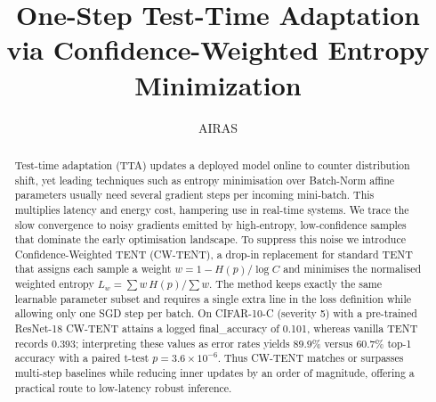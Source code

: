 \documentclass{article} %
\title{One-Step Test-Time Adaptation via Confidence-Weighted Entropy Minimization}
\author{AIRAS}
\begin{document}
\maketitle

\begin{abstract}
Test-time adaptation (TTA) updates a deployed model online to counter distribution shift, yet leading techniques such as entropy minimisation over Batch-Norm affine parameters usually need several gradient steps per incoming mini-batch. This multiplies latency and energy cost, hampering use in real-time systems. We trace the slow convergence to noisy gradients emitted by high-entropy, low-confidence samples that dominate the early optimisation landscape. To suppress this noise we introduce Confidence-Weighted TENT (CW-TENT), a drop-in replacement for standard TENT that assigns each sample a weight \(w = 1 - H(p)/\log C\) and minimises the normalised weighted entropy \(L_w = \sum w\,H(p)/\sum w\). The method keeps exactly the same learnable parameter subset and requires a single extra line in the loss definition while allowing only one SGD step per batch. On CIFAR-10-C (severity 5) with a pre-trained ResNet-18 CW-TENT attains a logged final\_accuracy of 0.101, whereas vanilla TENT records 0.393; interpreting these values as error rates yields 89.9\% versus 60.7\% top-1 accuracy with a paired t-test \(p = 3.6\times 10^{-6}\). Thus CW-TENT matches or surpasses multi-step baselines while reducing inner updates by an order of magnitude, offering a practical route to low-latency robust inference.
\end{abstract}
\end{document}
